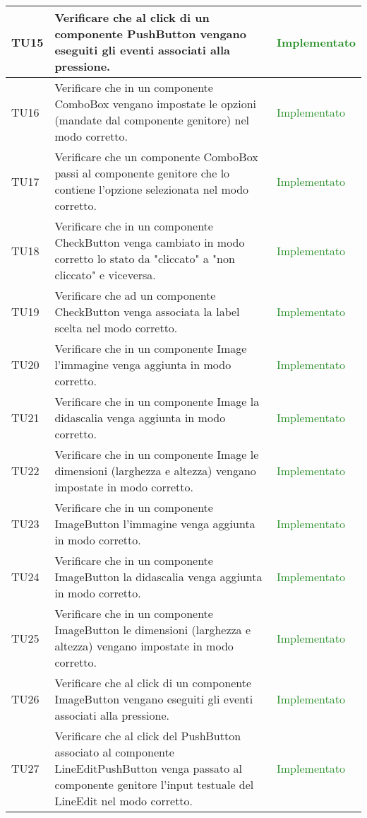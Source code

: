 \begin{center}
\begin{longtable}{|
*{1}{>{\centering\arraybackslash}p{1.3cm}|}
*{1}{>{\centering\arraybackslash}p{7.5cm}|}
*{1}{>{\centering\arraybackslash}p{3cm}|}}
 \hline 
TU15 & Verificare che al click di un componente PushButton vengano eseguiti gli eventi associati alla pressione. & \textcolor{ForestGreen}{Implementato}\\
 \hline 
TU16 & Verificare che in un componente ComboBox vengano impostate le opzioni (mandate dal componente genitore) nel modo corretto. & \textcolor{ForestGreen}{Implementato}\\
 \hline 
TU17 & Verificare che un componente ComboBox passi al componente genitore che lo contiene l'opzione selezionata nel modo corretto. & \textcolor{ForestGreen}{Implementato}\\
 \hline 
TU18 & Verificare che in un componente CheckButton venga cambiato in modo corretto lo stato da "cliccato" a "non cliccato" e viceversa. & \textcolor{ForestGreen}{Implementato}\\
 \hline 
TU19 & Verificare che ad un componente CheckButton venga associata la label scelta nel modo corretto. & \textcolor{ForestGreen}{Implementato}\\
 \hline 
TU20 & Verificare che in un componente Image l'immagine venga aggiunta in modo corretto. & \textcolor{ForestGreen}{Implementato}\\
 \hline 
TU21 & Verificare che in un componente Image la didascalia venga aggiunta in modo corretto. & \textcolor{ForestGreen}{Implementato}\\
 \hline 
TU22 & Verificare che in un componente Image le dimensioni (larghezza e altezza) vengano impostate in modo corretto. & \textcolor{ForestGreen}{Implementato}\\
 \hline 
TU23 & Verificare che in un componente ImageButton l'immagine venga aggiunta in modo corretto. & \textcolor{ForestGreen}{Implementato}\\
 \hline 
TU24 & Verificare che in un componente ImageButton la didascalia venga aggiunta in modo corretto. & \textcolor{ForestGreen}{Implementato}\\
 \hline 
TU25 & Verificare che in un componente ImageButton le dimensioni (larghezza e altezza) vengano impostate in modo corretto. & \textcolor{ForestGreen}{Implementato}\\
 \hline 
TU26 & Verificare che al click di un componente ImageButton vengano eseguiti gli eventi associati alla pressione. & \textcolor{ForestGreen}{Implementato}\\
 \hline 
TU27 & Verificare che al click del PushButton associato al componente LineEditPushButton venga passato al componente genitore l'input testuale del LineEdit nel modo corretto. & \textcolor{ForestGreen}{Implementato}\\

\end{longtable}
\end{center}
